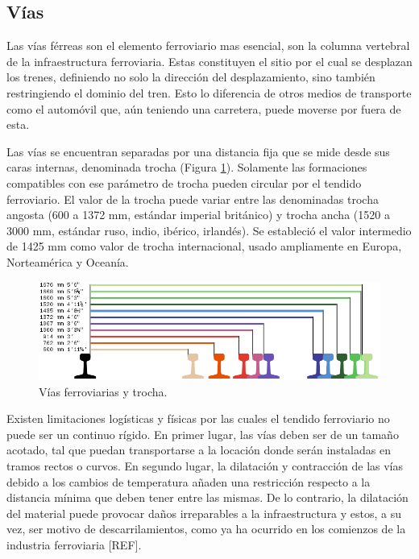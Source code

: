 \subsection{Vías}
	\label{sec:tracks}
	
    Las vías férreas son el elemento ferroviario mas esencial, son la columna vertebral de la infraestructura ferroviaria. Estas constituyen el sitio por el cual se desplazan los trenes, definiendo no solo la dirección del desplazamiento, sino también restringiendo el dominio del tren. Esto lo diferencia de otros medios de transporte como el automóvil que, aún teniendo una carretera, puede moverse por fuera de esta.

    Las vías se encuentran separadas por una distancia fija que se mide desde sus caras internas, denominada trocha (Figura \ref{fig:vias_1}). Solamente las formaciones compatibles con ese parámetro de trocha pueden circular por el tendido ferroviario. El valor de la trocha puede variar entre las denominadas trocha angosta (600 a 1372 mm, estándar imperial británico) y trocha ancha (1520 a 3000 mm, estándar ruso, indio, ibérico, irlandés). Se estableció el valor intermedio de 1425 mm como valor de trocha internacional, usado ampliamente en Europa, Norteamérica y Oceanía.

    \begin{figure}[!h]
        \centering
        \includegraphics[width=1\textwidth]{Figuras/trocha.png}
        \centering\caption{Vías ferroviarias y trocha.}
        \label{fig:vias_1}
    \end{figure}
    
    Existen limitaciones logísticas y físicas por las cuales el tendido ferroviario no puede ser un continuo rígido. En primer lugar, las vías deben ser de un tamaño acotado, tal que puedan transportarse a la locación donde serán instaladas en tramos rectos o curvos. En segundo lugar, la dilatación y contracción de las vías debido a los cambios de temperatura añaden una restricción respecto a la distancia mínima que deben tener entre las mismas. De lo contrario, la dilatación del material puede provocar daños irreparables a la infraestructura y estos, a su vez, ser motivo de descarrilamientos, como ya ha ocurrido en los comienzos de la industria ferroviaria [REF]. 
    
